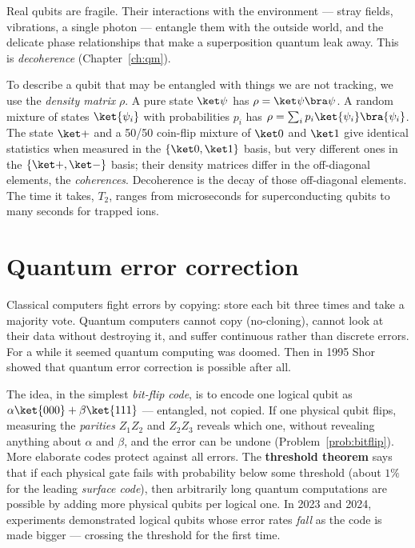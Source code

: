 Real qubits are fragile. Their interactions with the environment --- stray fields, vibrations, a single photon --- entangle them with the outside world, and the delicate phase relationships that make a superposition quantum leak away. This is \emph{decoherence} (Chapter~\ref{ch:qm}).

To describe a qubit that may be entangled with things we are not tracking, we use the \emph{density matrix} $\rho$. A pure state $\ket\psi$ has $\rho = \ket\psi\bra\psi$. A random mixture of states $\ket{\psi_i}$ with probabilities $p_i$ has $\rho = \sum_ip_i\ket{\psi_i}\bra{\psi_i}$. The state $\ket+$ and a 50/50 coin-flip mixture of $\ket0$ and $\ket1$ give identical statistics when measured in the $\{\ket0,\ket1\}$ basis, but very different ones in the $\{\ket+,\ket-\}$ basis; their density matrices differ in the off-diagonal elements, the \emph{coherences}. Decoherence is the decay of those off-diagonal elements. The time it takes, $T_2$, ranges from microseconds for superconducting qubits to many seconds for trapped ions.

\section{Quantum error correction}

Classical computers fight errors by copying: store each bit three times and take a majority vote. Quantum computers cannot copy (no-cloning), cannot look at their data without destroying it, and suffer continuous rather than discrete errors. For a while it seemed quantum computing was doomed. Then in 1995 Shor showed that quantum error correction is possible after all.

The idea, in the simplest \emph{bit-flip code}, is to encode one logical qubit as $\alpha\ket{000}+\beta\ket{111}$ --- entangled, not copied. If one physical qubit flips, measuring the \emph{parities} $Z_1Z_2$ and $Z_2Z_3$ reveals which one, without revealing anything about $\alpha$ and $\beta$, and the error can be undone (Problem~\ref{prob:bitflip}). More elaborate codes protect against all errors. The \textbf{threshold theorem} says that if each physical gate fails with probability below some threshold (about $1\%$ for the leading \emph{surface code}), then arbitrarily long quantum computations are possible by adding more physical qubits per logical one. In 2023 and 2024, experiments demonstrated logical qubits whose error rates \emph{fall} as the code is made bigger --- crossing the threshold for the first time.

